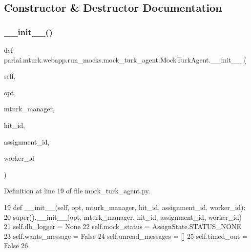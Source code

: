 \subsection{Constructor \& Destructor Documentation}
\mbox{\label{classparlai_1_1mturk_1_1webapp_1_1run__mocks_1_1mock__turk__agent_1_1MockTurkAgent_a99bfa776d86b818326766f6acf283790}} 
\subsubsection{\texorpdfstring{\+\_\+\+\_\+init\+\_\+\+\_\+()}{\_\_init\_\_()}}
{\footnotesize\ttfamily def parlai.\+mturk.\+webapp.\+run\+\_\+mocks.\+mock\+\_\+turk\+\_\+agent.\+Mock\+Turk\+Agent.\+\_\+\+\_\+init\+\_\+\+\_\+ (\begin{DoxyParamCaption}\item[{}]{self,  }\item[{}]{opt,  }\item[{}]{mturk\+\_\+manager,  }\item[{}]{hit\+\_\+id,  }\item[{}]{assignment\+\_\+id,  }\item[{}]{worker\+\_\+id }\end{DoxyParamCaption})}



Definition at line 19 of file mock\+\_\+turk\+\_\+agent.\+py.


\begin{DoxyCode}
19     \textcolor{keyword}{def }\_\_init\_\_(self, opt, mturk\_manager, hit\_id, assignment\_id, worker\_id):
20         super().\_\_init\_\_(opt, mturk\_manager, hit\_id, assignment\_id, worker\_id)
21         self.db\_logger = \textcolor{keywordtype}{None}
22         self.mock\_status = AssignState.STATUS\_NONE
23         self.wants\_message = \textcolor{keyword}{False}
24         self.unread\_messages = []
25         self.timed\_out = \textcolor{keyword}{False}
26 
\end{DoxyCode}


